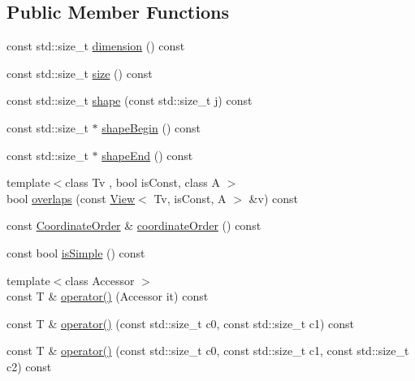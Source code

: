 \subsection*{Public Member Functions}
\begin{DoxyCompactItemize}
\item 
const std\+::size\+\_\+t \hyperlink{classandres_1_1ViewExpression_a3ab6c2c6b98c8d353a9de82ce35a94c4}{dimension} () const
\item 
const std\+::size\+\_\+t \hyperlink{classandres_1_1ViewExpression_aec0e6310accbc6774bc40e1e2c2a2c1b}{size} () const
\item 
const std\+::size\+\_\+t \hyperlink{classandres_1_1ViewExpression_ae81de4e50d07d2587951a4b23d5a5490}{shape} (const std\+::size\+\_\+t j) const
\item 
const std\+::size\+\_\+t $\ast$ \hyperlink{classandres_1_1ViewExpression_aeeb7dd43b8dbbd5b16e9e79f9de5b31a}{shape\+Begin} () const
\item 
const std\+::size\+\_\+t $\ast$ \hyperlink{classandres_1_1ViewExpression_aa379edb9a9c633b93391f5f696954a3a}{shape\+End} () const
\item 
{\footnotesize template$<$class Tv , bool is\+Const, class A $>$ }\\bool \hyperlink{classandres_1_1ViewExpression_a13f42c4594a3ab70270d0e09b2274fdf}{overlaps} (const \hyperlink{classandres_1_1View}{View}$<$ Tv, is\+Const, A $>$ \&v) const
\item 
const \hyperlink{namespaceandres_a2ac8b7aa89d44e8188a7c0ba50f4306b}{Coordinate\+Order} \& \hyperlink{classandres_1_1ViewExpression_a67a24ee7d620da58cf7d83995b411149}{coordinate\+Order} () const
\item 
const bool \hyperlink{classandres_1_1ViewExpression_ad9d83c265ad470fca0403cab659dbf0a}{is\+Simple} () const
\item 
{\footnotesize template$<$class Accessor $>$ }\\const T \& \hyperlink{classandres_1_1ViewExpression_a48402109c0f13163f994ce447edccce7}{operator()} (Accessor it) const
\item 
const T \& \hyperlink{classandres_1_1ViewExpression_a5df049ddbd24fadc19990fd7b7cee50e}{operator()} (const std\+::size\+\_\+t c0, const std\+::size\+\_\+t c1) const
\item 
const T \& \hyperlink{classandres_1_1ViewExpression_a70a004e660132d2e014a7c9fba4e2f52}{operator()} (const std\+::size\+\_\+t c0, const std\+::size\+\_\+t c1, const std\+::size\+\_\+t c2) const
\item 

\end{DoxyCompactItemize}
